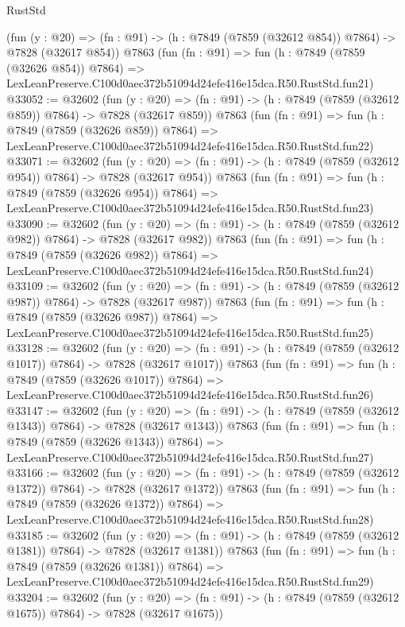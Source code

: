 \begin{lexlean}{RustStd}
\begin{coremodule}
    (fun (y : @20) => (fn : @91) -> (h : @7849 (@7859 (@32612 @854)) @7864) -> @7828 (@32617 @854))
    @7863
    (fun (fn : @91) =>
    fun (h : @7849 (@7859 (@32626 @854)) @7864) =>
    LexLeanPreserve.C100d0aec372b51094d24efe416e15dca.R50.RustStd.fun21)
@33052 := @32602
    (fun (y : @20) => (fn : @91) -> (h : @7849 (@7859 (@32612 @859)) @7864) -> @7828 (@32617 @859))
    @7863
    (fun (fn : @91) =>
    fun (h : @7849 (@7859 (@32626 @859)) @7864) =>
    LexLeanPreserve.C100d0aec372b51094d24efe416e15dca.R50.RustStd.fun22)
@33071 := @32602
    (fun (y : @20) => (fn : @91) -> (h : @7849 (@7859 (@32612 @954)) @7864) -> @7828 (@32617 @954))
    @7863
    (fun (fn : @91) =>
    fun (h : @7849 (@7859 (@32626 @954)) @7864) =>
    LexLeanPreserve.C100d0aec372b51094d24efe416e15dca.R50.RustStd.fun23)
@33090 := @32602
    (fun (y : @20) => (fn : @91) -> (h : @7849 (@7859 (@32612 @982)) @7864) -> @7828 (@32617 @982))
    @7863
    (fun (fn : @91) =>
    fun (h : @7849 (@7859 (@32626 @982)) @7864) =>
    LexLeanPreserve.C100d0aec372b51094d24efe416e15dca.R50.RustStd.fun24)
@33109 := @32602
    (fun (y : @20) => (fn : @91) -> (h : @7849 (@7859 (@32612 @987)) @7864) -> @7828 (@32617 @987))
    @7863
    (fun (fn : @91) =>
    fun (h : @7849 (@7859 (@32626 @987)) @7864) =>
    LexLeanPreserve.C100d0aec372b51094d24efe416e15dca.R50.RustStd.fun25)
@33128 := @32602
    (fun (y : @20) =>
    (fn : @91) -> (h : @7849 (@7859 (@32612 @1017)) @7864) -> @7828 (@32617 @1017))
    @7863
    (fun (fn : @91) =>
    fun (h : @7849 (@7859 (@32626 @1017)) @7864) =>
    LexLeanPreserve.C100d0aec372b51094d24efe416e15dca.R50.RustStd.fun26)
@33147 := @32602
    (fun (y : @20) =>
    (fn : @91) -> (h : @7849 (@7859 (@32612 @1343)) @7864) -> @7828 (@32617 @1343))
    @7863
    (fun (fn : @91) =>
    fun (h : @7849 (@7859 (@32626 @1343)) @7864) =>
    LexLeanPreserve.C100d0aec372b51094d24efe416e15dca.R50.RustStd.fun27)
@33166 := @32602
    (fun (y : @20) =>
    (fn : @91) -> (h : @7849 (@7859 (@32612 @1372)) @7864) -> @7828 (@32617 @1372))
    @7863
    (fun (fn : @91) =>
    fun (h : @7849 (@7859 (@32626 @1372)) @7864) =>
    LexLeanPreserve.C100d0aec372b51094d24efe416e15dca.R50.RustStd.fun28)
@33185 := @32602
    (fun (y : @20) =>
    (fn : @91) -> (h : @7849 (@7859 (@32612 @1381)) @7864) -> @7828 (@32617 @1381))
    @7863
    (fun (fn : @91) =>
    fun (h : @7849 (@7859 (@32626 @1381)) @7864) =>
    LexLeanPreserve.C100d0aec372b51094d24efe416e15dca.R50.RustStd.fun29)
@33204 := @32602
    (fun (y : @20) =>
    (fn : @91) -> (h : @7849 (@7859 (@32612 @1675)) @7864) -> @7828 (@32617 @1675))

\end{coremodule}
\end{lexlean}
